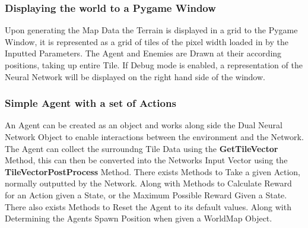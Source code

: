 \begin{flushleft}
            \vspace{0.5cm}    
        \subsubsection{Displaying the world to a Pygame Window}
            \vspace{0.2cm}
            Upon generating the Map Data the Terrain is displayed in a grid to the Pygame Window, it is represented as a grid of tiles of the pixel 
            width loaded in by the Inputted Parameters. The Agent and Enemies are Drawn at their according positions, taking up entire Tile. If Debug
            mode is enabled, a representation of the Neural Network will be displayed on the right hand side of the window. \\

            \vspace{0.5cm}   
        \subsubsection{Simple Agent with a set of Actions}
            \vspace{0.2cm}
            An Agent can be created as an object and works along side the Dual Neural Network Object to enable interactions between the environment and
            the Network. The Agent can collect the surroundng Tile Data using the \textbf{GetTileVector} Method, this can then be converted into the
            Networks Input Vector using the \textbf{TileVectorPostProcess} Method. There exists Methods to Take a given Action, normally outputted by
            the Network. Along with Methods to Calculate Reward for an Action given a State, or the Maximum Possible Reward Given a State. \\
            \vspace{0.2cm}
            There also exists Methods to Reset the Agent to its default values. Along with Determining the Agents Spawn Position when given a WorldMap
            Object. \\

            \vspace{0.5cm}   

\end{flushleft}
